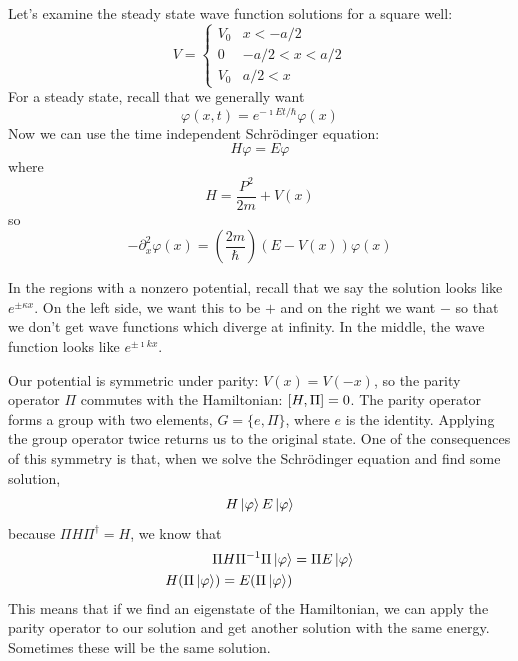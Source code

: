 \documentclass[a4paper,twoside,master.tex]{subfiles}
\begin{document}

Let's examine the steady state wave function solutions for a square well:
\begin{equation}
    V =
    \begin{cases} 
        V_0 & x < -a/2\\
        0 & -a/2<x<a/2\\
        V_0 & a/2 < x
    \end{cases}
\end{equation}
For a steady state, recall that we generally want
\begin{equation}
    \varphi(x,t) = e^{- \imath E t / \hbar} \varphi(x)
\end{equation}
Now we can use the time independent Schr\"odinger equation:
\begin{equation}
    H \varphi = E \varphi
\end{equation}
where
\begin{equation}
    H = \frac{P^2}{2m} + V(x)
\end{equation}
so
\begin{equation}
    - \partial_x^2 \varphi(x)  = \left( \frac{2m}{\hbar} \right)(E-V(x)) \varphi(x)
\end{equation}

In the regions with a nonzero potential, recall that we say the solution looks like $ e^{\pm \kappa x} $. On the left side, we want this to be $ + $ and on the right we want $ - $ so that we don't get wave functions which diverge at infinity. In the middle, the wave function looks like $ e^{\pm \imath k x} $.

Our potential is symmetric under parity: $ V(x) = V(-x) $, so the parity operator $ \Pi $ commutes with the Hamiltonian: $ \comm{H}{\Pi} =0 $. The parity operator forms a group with two elements, $ G = \{e, \Pi\} $, where $ e $ is the identity. Applying the group operator twice returns us to the original state. One of the consequences of this symmetry is that, when we solve the Schr\"odinger equation and find some solution,
\begin{equation}
    H \ket{\varphi} E \ket{\varphi}
\end{equation}
because $ \Pi H \Pi^\dagger = H $, we know that
\begin{align}
    \Pi H \Pi^{-1} \Pi \ket{\varphi} &= \Pi E \ket{\varphi}\\
    H(\Pi \ket{\varphi})= E(\Pi \ket{\varphi})
\end{align}
This means that if we find an eigenstate of the Hamiltonian, we can apply the parity operator to our solution and get another solution with the same energy. Sometimes these will be the same solution.
\end{document}
